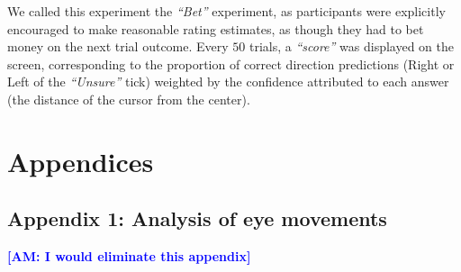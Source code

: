 \documentclass[12pt,english]{article}%
\newcommand{\AM}[1]{\textbf{\textcolor{blue}{[AM: #1]}}}
\begin{document}
We called this experiment the \textit{ ``Bet''} experiment, as participants were explicitly encouraged to make reasonable rating estimates, as though they had to bet money on the next trial outcome. Every $50$ trials, a \textit{``score''} was displayed on the screen, corresponding to the proportion of correct direction predictions (Right or Left of the \textit{``Unsure''} tick) weighted by the confidence attributed to each answer (the distance of the cursor from the center).




\section{Appendices}
\subsection{Appendix 1: Analysis of eye movements}
\label{app:em}
\AM{I would eliminate this appendix}
\end{document}
